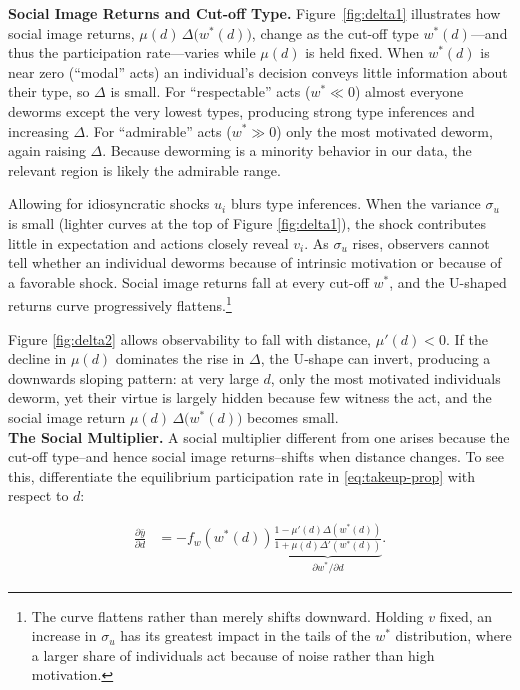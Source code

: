 \documentclass[12pt,a4paper]{article}
\begin{document}
\textbf{Social Image Returns and Cut-off Type.} Figure~\ref{fig:delta1} illustrates how social image returns, $\mu(d)\,\Delta\!\bigl(w^{\ast}(d)\bigr)$, change as the cut-off type \(w^\ast(d)\)—and thus the participation rate—varies while $\mu(d)$ is held fixed. When $w^{\ast}(d)$ is near zero (``modal'' acts) an individual’s decision conveys little information about their type, so $\Delta$ is small. For ``respectable'' acts ($w^{\ast}\!\ll 0$) almost everyone deworms except the very lowest types, producing strong type inferences and increasing $\Delta$.  For ``admirable'' acts ($w^{\ast}\!\gg 0$) only the most motivated deworm, again raising $\Delta$. Because deworming is a minority behavior in our data, the relevant region is likely the admirable range.

Allowing for idiosyncratic shocks $u_i$ blurs type inferences.  When the variance $\sigma_{u}$ is small (lighter curves at the top of Figure \ref{fig:delta1}), the shock contributes little in expectation and actions closely reveal $v_i$. As $\sigma_{u}$ rises, observers cannot tell whether an individual deworms because of intrinsic motivation or because of a favorable shock. Social image returns fall at every cut-off $w^\ast$, and the U-shaped returns curve progressively flattens.\footnote{The curve flattens rather than merely shifts downward. Holding $v$ fixed, an increase in $\sigma_u$ has its greatest impact in the tails of the $w^\ast$ distribution, where a larger share of individuals act because of noise rather than high motivation.} 


Figure \ref{fig:delta2} allows observability to fall with distance, $\mu'(d)\!<0$.  If the decline in $\mu(d)$ dominates the rise in $\Delta$, the U‑shape can invert, producing a downwards sloping pattern: at very large $d$, only the most motivated individuals deworm, yet their virtue is largely hidden because few witness the act, and the social image return $\mu(d)\,\Delta\!\bigl(w^{\ast}(d)\bigr)$ becomes small. \\


\textbf{The Social Multiplier.} A social multiplier different from one arises because the cut-off type--and hence social image returns--shifts when distance changes. To see this, differentiate the equilibrium participation rate in \eqref{eq:takeup-prop} with respect to $d$:

\begin{align*}\label{eq:sm}
    \frac{\partial \bar{y}}{\partial d} &= -f_w(w^\ast(d)) \underbrace{\frac{1 - \mu'(d) \Delta(w^\ast(d))}{1 + \mu(d) \Delta'(w^\ast(d))}}_{\partial w^\ast/\partial d}.  
\end{align*}
\end{document}
